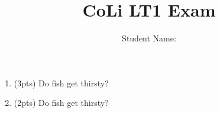 \documentclass[10pt]{article}
\title{CoLi LT1 Exam}
\author{Student Name: \blank{12em}}}
\begin{document}
\maketitle

\hspace*{-4em}%
\begin{enumerate}[label=\bfseries Question \arabic*:]
\item (3pts) Do fish get thirsty?
\item (2pts) Do fish get thirsty?
\end{enumerate}
\end{document}
